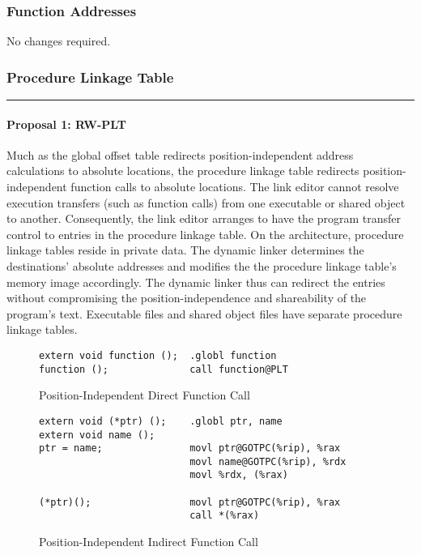 \subsubsection{Function Addresses}

No changes required.

\subsubsection{Procedure Linkage Table}



\bigskip\hrule

\paragraph{Proposal 1: RW-PLT}


Much as the global offset table redirects position-independent address
calculations to absolute locations, the procedure linkage table
redirects position-independent function calls to absolute locations.
The link editor cannot resolve execution transfers (such as function
calls) from one executable or shared object to another.  Consequently,
the link editor arranges to have the program transfer control to
entries in the procedure linkage table.  On the \xARCH architecture,
procedure linkage tables reside in private data.  The dynamic linker
determines the destinations' absolute addresses and modifies the the
procedure linkage table's memory image accordingly.  The dynamic
linker thus can redirect the entries without compromising the
position-independence and shareability of the program's text.
Executable files and shared object files have separate procedure
linkage tables.

\begin{figure}[H]
\caption{Position-Independent Direct Function Call}
\begin{verbatim}
extern void function ();  .globl function
function ();              call function@PLT
\end{verbatim}
\end{figure}

\begin{figure}[H]
\caption{Position-Independent Indirect Function Call}
\begin{verbatim}
extern void (*ptr) ();    .globl ptr, name
extern void name ();
ptr = name;               movl ptr@GOTPC(%rip), %rax
                          movl name@GOTPC(%rip), %rdx
                          movl %rdx, (%rax)

(*ptr)();                 movl ptr@GOTPC(%rip), %rax
                          call *(%rax)
\end{verbatim}
\end{figure}


